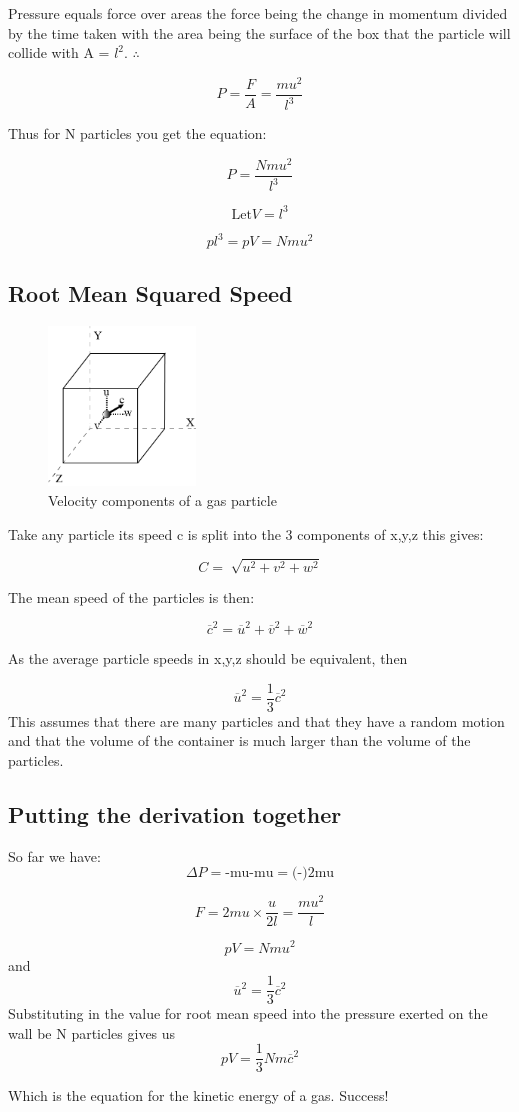\documentclass[a4paper]{article}
\begin{document}
Pressure equals force over areas the force being the change in momentum divided by the time taken with the area being the surface of the box that the particle will collide with A = \(l^2\).  $\therefore$

\[P = \frac{F}{A} = \frac{mu^2}{l^3}\]

Thus for N particles you get the equation:

\[P = \frac{Nmu^2}{l^3}\]

\[ \text{Let} V=l^3 \]

\[ pl^3 = pV = Nmu^2 \]

\subsection{Root Mean Squared Speed}

\begin{figure}[H]
	\centering
	\includegraphics[width=0.35\textwidth]{Diagrams/rootspeed}
	\caption{Velocity components of a gas particle}
\end{figure}

Take any particle its speed c is split into the 3 components of x,y,z this gives:

\[C = \sqrt[]{u^2+v^2+w^2}\]

The mean speed of the particles is then:

\[\overline{c}^2 = \overline{u}^2 + \overline{v}^2 + \overline{w}^2\]

As the average particle speeds in x,y,z should be equivalent, then

\[\overline{u}^2 = \frac{1}{3}\overline{c}^2 \]
\small *This assumes that there are many particles and that they have a random motion and that the volume of the container is much larger than the volume of the particles.\normalsize
\subsection{Putting the derivation together}

So far we have:
\[\Delta P=\text{-mu-mu}=\text{(-)2mu} \]

\[F = 2mu \times \frac{u}{2l} = \frac{mu^2}{l}\]

\[ pV = Nmu^2 \]
and
\[\overline{u}^2 = \frac{1}{3}\overline{c}^2 \]
Substituting in the value for root mean speed into the pressure exerted on the wall be N particles gives us
\[pV = \frac{1}{3}Nm \overline{c}^2\]

Which is the equation for the kinetic energy of a gas. Success!
\end{document}
